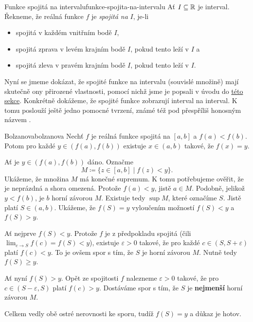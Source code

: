 \begin{definition}{Funkce spojitá na intervalu}{funkce-spojita-na-intervalu}
 Ať $I \subseteq \mathbb{R}$ je interval. Řekneme, že reálná funkce $f$ je
 \emph{spojitá na} $I$, je-li
 \begin{itemize}
  \item spojitá v každém vnitřním bodě $I$,
  \item spojitá zprava v levém krajním bodě $I$, pokud tento leží v $I$ a
  \item spojitá zleva v pravém krajním bodě $I$, pokud tento leží v $I$.
 \end{itemize}
\end{definition}

Nyní se jmeme dokázat, že spojité funkce na intervalu (souvislé množině) mají
skutečně ony přirozené vlastnosti, pomocí nichž jsme je popsali v úvodu do
\hyperref[sec:spojite-funkce]{této sekce}. Konkrétně dokážeme, že spojité funkce
zobrazují interval na interval. K tomu poslouží ještě jedno pomocné tvrzení,
známé též pod přespříliš honosným názvem .

\begin{theorem}{Bolzanova}{bolzanova}
 Nechť $f$ je reálná funkce spojitá na $[a,b]$ a $f(a) < f(b)$. Potom pro každé
 $y \in (f(a),f(b))$ existuje $x \in (a,b)$ takové, že $f(x) = y$.
\end{theorem}
\begin{thmproof}
 Ať je $y \in (f(a),f(b))$ dáno. Označme
 \[
  M \coloneqq \{z \in [a,b] \mid f(z) < y\}.
 \]
 Ukážeme, že množina $M$ má konečné supremum. K tomu potřebujeme ověřit, že je
 neprázdná a shora omezená. Protože $f(a) < y$, jistě $a \in M$. Podobně,
 jelikož $y < f(b)$, je $b$ horní závorou $M$. Existuje tedy $\sup M$, které
 označíme $S$. Jistě platí $S \in (a,b)$. Ukážeme, že $f(S) = y$ vyloučením
 možností $f(S) < y$ a $f(S) > y$.

 Ať nejprve $f(S) < y$. Protože $f$ je z předpokladu spojitá (čili $\lim_{c \to
 S} f(c) = f(S) < y$), existuje $\varepsilon>0$ takové, že pro každé $c \in
 (S,S+\varepsilon)$ platí $f(c) < y$. To je ovšem spor s tím, že $S$ je horní
 závorou $M$. Nutně tedy $f(S) \geq y$.

 Ať nyní $f(S) > y$. Opět ze spojitosti $f$ nalezneme $\varepsilon>0$ takové, že
 pro $c \in (S-\varepsilon,S)$ platí $f(c) > y$. Dostáváme spor s tím, že $S$ je
 \textbf{nejmenší} horní závorou $M$.

 Celkem vedly obě ostré nerovnosti ke sporu, tudíž $f(S) = y$ a důkaz je hotov.
\end{thmproof}


